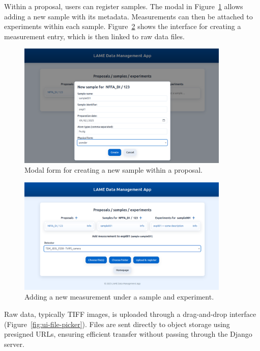 \FloatBarrier
Within a proposal, users can register samples. 
The modal in Figure~\ref{fig:ui-modal-sample} allows adding a new sample with 
its metadata. 
Measurements can then be attached to experiments within each sample. 
Figure~\ref{fig:ui-add-measurement} shows the interface for creating a measurement entry, 
which is then linked to raw data files.

\begin{figure}[!h]
	\centering
	\includegraphics[width=0.9\textwidth]{img/chpt5/ui_modal_new_sample.png}
	\caption{Modal form for creating a new sample within a proposal.}
	\label{fig:ui-modal-sample}
\end{figure}

\begin{figure}[!h]
	\centering
	\includegraphics[width=0.9\textwidth]{img/chpt5/ui_add_measurement.png}
	\caption{Adding a new measurement under a sample and experiment.}
	\label{fig:ui-add-measurement}
\end{figure}

\FloatBarrier
Raw data, typically TIFF images, is uploaded through a drag-and-drop interface 
(Figure~\ref{fig:ui-file-picker}). 
Files are sent directly to object storage using presigned URLs, 
ensuring efficient transfer without passing through the Django server.

